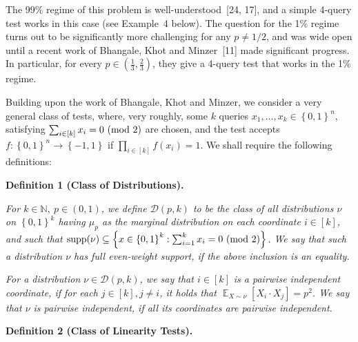 \documentclass[10pt,a4paper]{article}
\begin{document}
The 99\% regime of this problem is well-understood [24, 17], and a simple 4-query test works in this case (see Example 4 below).
The question for the 1\% regime turns out to be significantly more challenging for any $p\not=1/2$, and was wide open until a recent work of Bhangale, Khot and Minzer [11] made significant progress.
In particular, for every $p\in\left(\frac{1}{3},\frac{2}{3}\right)$, they give a 4-query test that works in the 1\% regime.\par




Building upon the work of Bhangale, Khot and Minzer, we consider a very general class of tests, where, very roughly, some $k$ queries $x_{1},\dots,x_{k}\in\left\{0,1\right\}^{n}$, satisfying $\sum_{i\in[k]}x_{i}=0\textnormal{ (mod 2)}$ are chosen, and the test accepts $f:\left\{0,1\right\}^{n}\to\left\{-1,1\right\}$ if $\prod_{i\in[k]}f(x_{i})=1$.
We shall require the following definitions:\par





\par\medskip\noindent\textbf{
\textbf{Definition 1}\textbf{ }(Class of Distributions)\textbf{.}
}\par



\emph{For $k\in\mathbb{N},\ p\in(0,1)$, we define $\mathcal{D}(p,k)$ to be the class of all distributions $\nu$ on $\left\{0,1\right\}^{k}$ having $\mu_{p}$ as the marginal distribution on each coordinate $i\in[k]$, and such that $\textnormal{supp}(\nu)\subseteq\left\{x\in\left\{0,1\right\}^{k}:\sum_{i=1}^{k}x_{i}=0\textnormal{ (mod 2)}\right\}$.
We say that such a distribution $\nu$ has full even-weight support, if the above inclusion is an equality.}\par




\emph{For a distribution $\nu\in\mathcal{D}(p,k)$, we say that $i\in[k]$ is a pairwise independent coordinate, if for each $j\in[k],j\not=i$, it holds that $\mathop{\mathbb{E}}_{X\sim\nu}\left[X_{i}\cdot X_{j}\right]=p^{2}$.
We say that $\nu$ is pairwise independent, if all its coordinates are pairwise independent.}\par







\par\medskip\noindent\textbf{
\textbf{Definition 2}\textbf{ }(Class of Linearity Tests)\textbf{.}
}\par
\end{document}
